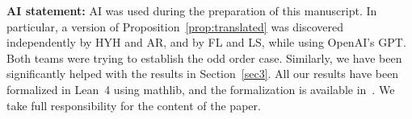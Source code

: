 \documentclass[11pt]{amsart}
\numberwithin{equation}{section}
\theoremstyle{definition}
\theoremstyle{remark}
\begin{document}
\vspace{0.2cm} \noindent
 {\bfseries AI statement:}
 AI was used during the preparation of this manuscript.
 In particular, a version of Proposition~\ref{prop:translated}
 was discovered independently by HYH and AR, and by FL and LS, while using OpenAI's GPT.
 Both teams were trying to establish the odd order case.
 Similarly, we have been significantly helped with the results in Section~\ref{sec3}.
 All our results have been formalized in Lean~4 using mathlib, and the formalization is available in~\cite{HLRS26}.
 We take full responsibility for the content of the paper.
\end{document}
